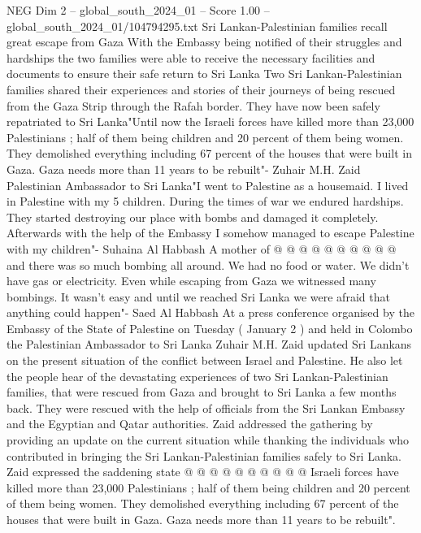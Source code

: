 \begin{textsample}{NEG Dim 2 – global\_south\_2024\_01 – Score 1.00 – global\_south\_2024\_01/104794295.txt}  \label{ex:f2_neg_348}
Sri Lankan-Palestinian families recall great escape from Gaza With the Embassy being notified of their struggles and hardships the two families were able to receive the necessary facilities and documents to ensure their safe return to Sri Lanka Two Sri Lankan-Palestinian families shared their experiences and stories of their journeys of being rescued from the Gaza Strip through the Rafah border.
They have now been safely repatriated to Sri Lanka"Until now the Israeli forces have killed more than 23,000 Palestinians ; half of them being children and 20 percent of them being women.
They demolished everything including 67 percent of the houses that were built in Gaza.
Gaza needs more than 11 years to be rebuilt"- Zuhair M.H.
Zaid Palestinian Ambassador to Sri Lanka"I went to Palestine as a housemaid.
I lived in Palestine with my 5 children.
During the times of war we endured hardships.
They started destroying our place with bombs and damaged it completely.
Afterwards with the help of the Embassy I somehow managed to escape Palestine with my children"- Suhaina Al Habbash A mother of @ @ @ @ @ @ @ @ @ @ and there was so much bombing all around.
We had no food or water.
We didn't have gas or electricity.
Even while escaping from Gaza we witnessed many bombings.
It wasn't easy and until we reached Sri Lanka we were afraid that anything could happen"- Saed Al Habbash At a press conference organised by the Embassy of the State of Palestine on Tuesday ( January 2 ) and held in Colombo the Palestinian Ambassador to Sri Lanka Zuhair M.H.
Zaid updated Sri Lankans on the present situation of the conflict between Israel and Palestine.
He also let the people hear of the devastating experiences of two Sri Lankan-Palestinian families, that were rescued from Gaza and brought to Sri Lanka a few months back.
They were rescued with the help of officials from the Sri Lankan Embassy and the Egyptian and Qatar authorities.
Zaid addressed the gathering by providing an update on the current situation while thanking the individuals who contributed in bringing the Sri Lankan-Palestinian families safely to Sri Lanka.
Zaid expressed the saddening state @ @ @ @ @ @ @ @ @ @ Israeli forces have killed more than 23,000 Palestinians ; half of them being children and 20 percent of them being women.
They demolished everything including 67 percent of the houses that were built in Gaza.
Gaza needs more than 11 years to be rebuilt".

\end{textsample}
